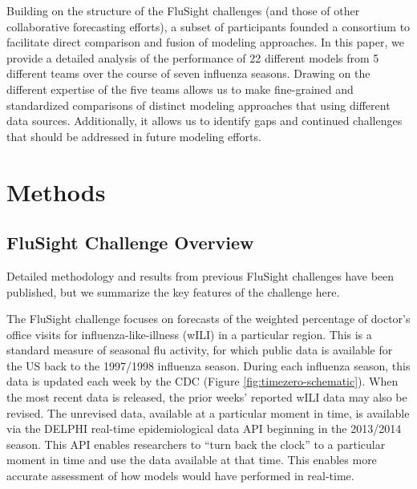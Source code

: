 \documentclass{article}
\begin{document}
Building on the structure of the FluSight challenges (and those of other collaborative forecasting efforts\cite{Viboud}), a subset of participants founded a consortium to facilitate direct comparison and fusion of modeling approaches. 
In this paper, we provide a detailed analysis of the performance of 22 different models from 5 different teams over the course of seven influenza seasons.
Drawing on the different expertise of the five teams allows us to make fine-grained and standardized comparisons of distinct modeling approaches that using different data sources.
Additionally, it allows us to identify gaps and continued challenges that should be addressed in future modeling efforts. 





\section{Methods}

\subsection{FluSight Challenge Overview}
 
Detailed methodology and results from previous FluSight challenges have been published\cite{Biggerstaff2016}, but we summarize the key features of the challenge here.

The FluSight challenge focuses on forecasts of the weighted percentage of doctor's office visits for influenza-like-illness (wILI) in a particular region. 
This is a standard measure of seasonal flu activity, for which public data is available for the US back to the 1997/1998 influenza season. 
During each influenza season, this data is updated each week by the CDC (Figure \ref{fig:timezero-schematic}). When the most recent data is released, the prior weeks' reported wILI data may also be revised. 
The unrevised data, available at a particular moment in time, is available via the DELPHI real-time epidemiological data API beginning in the 2013/2014 season.\cite{DELPHI} 
This API enables researchers to ``turn back the clock'' to a particular moment in time and use the data available at that time. This enables more accurate assessment of how models would have performed in real-time. 
\end{document}

